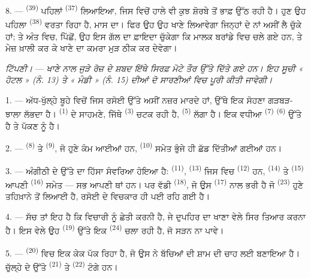 8. ---  \textsuperscript{(39)} ਪਹਿਲਾਂ 
\textsuperscript{(37)} ਲਿਆਇਆ, ਜਿਸ ਵਿਚੋਂ ਹਾਲੇ ਵੀ ਕੁਝ ਸ਼ੋਰਬੇ ਤੋਂ ਭਾਫ਼ ਉੱਠ ਰਹੀ ਹੈ।
ਹੁਣ ਉਹ ਪਹਿਲਾ  \textsuperscript{(38)} ਵਰਤਾ ਰਿਹਾ ਹੈ, ਮਾਸ ਦਾ। ਫਿਰ ਉਹ ਉਹ
ਖਾਣੇ ਲਿਆਵੇਗਾ ਜਿਨ੍ਹਾਂ ਦੇ ਨਾਂ ਅਸੀਂ ਲੈ ਚੁੱਕੇ ਹਾਂ; ਤੇ ਅੰਤ ਵਿਚ, 
ਪਿੱਛੋਂ, ਉਹ ਇਸ ਗੱਲ ਦਾ ਫ਼ਾਇਦਾ ਚੁੱਕੇਗਾ ਕਿ ਮਾਲਕ ਬਰਾਂਡੇ ਵਿਚ ਚਲੇ ਗਏ ਹਨ, ਤੇ ਮੇਜ਼ ਖ਼ਾਲੀ
ਕਰ ਕੇ ਖਾਣੇ ਦਾ ਕਮਰਾ ਮੁੜ ਠੀਕ ਕਰ ਦੇਵੇਗਾ।

\textit{ਟਿੱਪਣੀ।} --- \textit{ਖਾਣੇ ਨਾਲ ਜੁੜੇ ਰੋਜ਼ ਦੇ ਸ਼ਬਦ ਇੱਥੇ ਸਿਰਫ਼ ਮੋਟੇ ਤੌਰ ਉੱਤੇ
ਦਿੱਤੇ ਗਏ ਹਨ। ਇਹ ਸੂਚੀ « ਹੋਟਲ » (ਨੰ. 13) ਤੇ « ਮੰਡੀ » (ਨੰ. 15) ਦੀਆਂ ਦੋ ਸਾਰਣੀਆਂ ਵਿਚ
ਪੂਰੀ ਕੀਤੀ ਜਾਵੇਗੀ।}

\VUsaut{4.6mm}
\VUsaut{3.0mm}

1. --- ਅੱਧ-ਖੁੱਲ੍ਹੇ ਬੂਹੇ ਵਿਚੋਂ ਜਿਸ ਰਸੋਈ ਉੱਤੇ ਅਸੀਂ ਨਜ਼ਰ ਮਾਰਦੇ ਹਾਂ, ਉੱਥੇ ਇਕ ਸੋਹਣਾ
ਗੜਬੜ-ਝਾਲਾ ਲੱਭਦਾ ਹੈ।  \textsuperscript{(1)} ਦੇ ਸਾਹਮਣੇ, ਜਿੱਥੇ
 \textsuperscript{(3)} ਚਟਕ ਰਹੀ ਹੈ, 
\textsuperscript{(5)} ਲੱਗਾ ਹੈ। ਇਕ ਵਧੀਆ  \textsuperscript{(7)}
 \textsuperscript{(6)} ਉੱਤੇ ਹੈ ਤੇ ਪੱਕਣ ਨੂੰ ਹੈ।

2. ---  \textsuperscript{(8)} ਤੇ 
\textsuperscript{(9)}, ਜੋ ਹੁਣੇ ਕੰਮ ਆਈਆਂ ਹਨ,  \textsuperscript{(10)}
ਸਮੇਤ ਭੁੰਜੇ ਹੀ ਛੱਡ ਦਿੱਤੀਆਂ ਗਈਆਂ ਹਨ।

3. --- ਅੰਗੀਠੀ ਦੇ ਉੱਤੇ ਦਾ ਹਿੱਸਾ ਸੰਵਰਿਆ ਹੋਇਆ ਹੈ: 
\textsuperscript{(11)},  \textsuperscript{(13)} ਜਿਸ ਵਿਚ
 \textsuperscript{(12)} ਹਨ, 
\textsuperscript{(14)} ਤੇ  \textsuperscript{(15)} ਆਪਣੀ
 \textsuperscript{(16)} ਸਮੇਤ — ਸਭ ਆਪਣੀ ਥਾਂ ਹਨ। ਪਰ ਵੱਡੀ
 \textsuperscript{(18)}, ਜੋ ਉਸ 
\textsuperscript{(17)} ਨਾਲ ਭਰੀ ਹੈ ਜੋ  \textsuperscript{(23)} ਹੁਣੇ
ਤਹਿਖ਼ਾਨੇ ਤੋਂ ਲਿਆਈ ਹੈ, ਰਸੋਈ ਦੇ ਵਿਚਕਾਰ ਹੀ ਪਈ ਰਹਿ ਗਈ ਹੈ।

4. --- ਸੱਚ ਤਾਂ ਇਹ ਹੈ ਕਿ ਵਿਚਾਰੀ ਨੂੰ ਛੇਤੀ ਕਰਨੀ ਹੈ, ਜੇ ਦੁਪਹਿਰ ਦਾ ਖਾਣਾ ਵੇਲੇ ਸਿਰ
ਤਿਆਰ ਕਰਨਾ ਹੈ। ਇਸ ਵੇਲੇ ਉਹ  \textsuperscript{(19)} ਉੱਤੇ ਇਕ
 \textsuperscript{(24)} ਚਲਾ ਰਹੀ ਹੈ, ਜੋ ਸੜਨ ਨਾ ਪਾਵੇ।

5. ---  \textsuperscript{(20)} ਵਿਚ ਇਕ ਕੇਕ ਪੱਕ ਰਿਹਾ ਹੈ, ਜੋ ਉਸ ਨੇ
ਬੱਚਿਆਂ ਦੀ ਸ਼ਾਮ ਦੀ ਚਾਹ ਲਈ ਬਣਾਇਆ ਹੈ। ਚੁੱਲ੍ਹੇ ਦੇ ਉੱਤੇ 
\textsuperscript{(21)} ਤੇ  \textsuperscript{(22)} ਟੰਗੇ ਹਨ।


